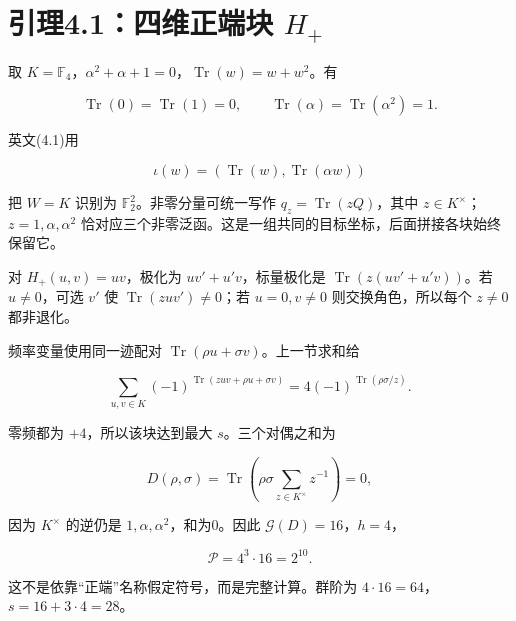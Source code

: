 \documentclass[UTF8,fontset=fandol,zihao=-4,openany,oneside]{ctexbook}
\begin{document}
\section{引理4.1：四维正端块 \texorpdfstring{\(H_+\)}{H+}}


取 \(K=\mathbb F_4\)，\(\alpha^2+\alpha+1=0\)，\(\operatorname{Tr}(w)=w+w^2\)。有



\[
\operatorname{Tr}(0)=\operatorname{Tr}(1)=0,\qquad
\operatorname{Tr}(\alpha)=\operatorname{Tr}(\alpha^2)=1.
\]



英文(4.1)用



\[
\iota(w)=(\operatorname{Tr}(w),\operatorname{Tr}(\alpha w))
\]



把 \(W=K\) 识别为 \(\mathbb F_2^2\)。非零分量可统一写作 \(q_z=\operatorname{Tr}(zQ)\)，其中 \(z\in K^\times\)；\(z=1,\alpha,\alpha^2\) 恰对应三个非零泛函。这是一组共同的目标坐标，后面拼接各块始终保留它。



对 \(H_+(u,v)=uv\)，极化为 \(uv'+u'v\)，标量极化是 \(\operatorname{Tr}(z(uv'+u'v))\)。若 \(u\ne0\)，可选 \(v'\) 使 \(\operatorname{Tr}(zuv')\ne0\)；若 \(u=0,v\ne0\) 则交换角色，所以每个 \(z\ne0\) 都非退化。



频率变量使用同一迹配对 \(\operatorname{Tr}(\rho u+\sigma v)\)。上一节求和给



\[
\sum_{u,v\in K}(-1)^{\operatorname{Tr}(zuv+\rho u+\sigma v)}
=4(-1)^{\operatorname{Tr}(\rho\sigma/z)}.
\]



零频都为 \(+4\)，所以该块达到最大 \(s\)。三个对偶之和为



\[
D(\rho,\sigma)=\operatorname{Tr}\left(\rho\sigma\sum_{z\in K^\times}z^{-1}\right)=0,
\]



因为 \(K^\times\) 的逆仍是 \(1,\alpha,\alpha^2\)，和为0。因此 \(\mathcal G(D)=16\)，\(h=4\)，



\[
\mathcal P=4^3\cdot16=2^{10}.
\]



这不是依靠“正端”名称假定符号，而是完整计算。群阶为 \(4\cdot16=64\)，\(s=16+3\cdot4=28\)。
\end{document}
